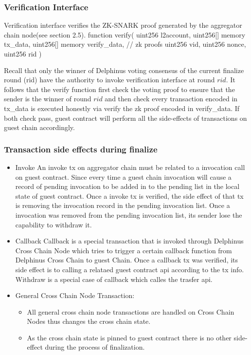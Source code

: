\documentclass[pageno]{jpaper}
\newenvironment{code}%
   {\snugshade\verbatim}%
   {\endverbatim\endsnugshade}
\begin{document}
\subsubsection{Verification Interface}
Verification interface verifies the ZK-SNARK proof generated by the aggregator chain node(see section 2.5).
\begin{code}
function verify(
  uint256 l2account,
  uint256[] memory tx_data,
  uint256[] memory verify_data, // zk proofs 
  uint256 vid,
  uint256 nonce,
  uint256 rid
)
\end{code}

Recall that only the winner of Delphinus voting consensus of the current finalize round (rid) have the authority to invoke verification interface at round $rid$. It follows that the verify function first check the voting proof to ensure that the sender is the winner of round $rid$ and then check every transaction encoded in tx\_data is executed honestly via verify the zk proof encoded in verify\_data. If both check pass, guest contract will perform all the side-effects of transactions on guest chain accordingly.\\

\subsubsection{Transaction side effects during finalize}
\begin{itemize}[leftmargin=*]
\item Invoke
    An invoke tx on aggregator chain must be related to a invocation call on guest contract. Since every time a guest chain invocation will cause a record of pending invocation to be added in to the pending list in the local state of guest contract.
    Once a invoke tx is verified, the side effect of that tx is removing the invocation record in the pending invocation list.
    Once a invocation was removed from the pending invocation list, its sender lose the capability to withdraw it.

\item Callback
    Callback is a special transaction that is invoked through Delphinus Cross Chain Node which tries to trigger a certain callback function from Delphinus Cross Chain to guest Chain.
    Once a callback tx was verified, its side effect is to calling a relataed guest contract api according to the tx info.
    Withdraw is a special case of callback which calles the trasfer api.

\item General Cross Chain Node Transaction:
    \begin{itemize}
    \item All general cross chain node transactions are handled on Cross Chain Nodes thus changes the cross chain state.
    \item As the cross chain state is pinned to guest contract there is no other side-effect during the process of finalization.
    \end{itemize}
\end{itemize}
\end{document}
